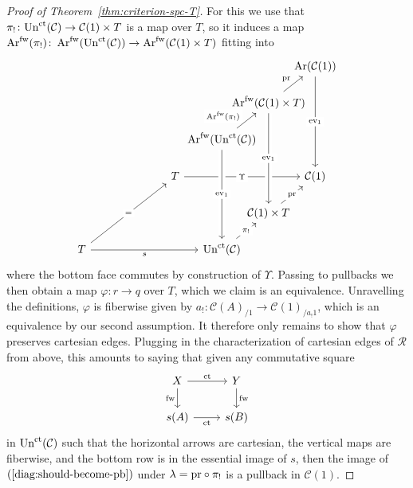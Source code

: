 \documentclass[reqno]{memo-l}
\theoremstyle{mythm}
\theoremstyle{definition}
\numberwithin{equation}{section}
\newcommand{\Cc}{{\mathcal{C}}}
\DeclareMathOperator{\ev}{ev}
\renewcommand{\phi}{\varphi}
\DeclareMathOperator{\Ar}{Ar}
\newcommand{\pr}{\textup{pr}}
\newcommand{\ct}{\textup{ct}}
\newcommand{\Un}{\textup{Un}}
\begin{document}
\begin{proof}[Proof of Theorem~\ref{thm:criterion-spc-T}]
    For this we use that $\pi_!\colon\Un^\ct(\Cc)\to\Cc(1)\times T$ is a map over $T$, so it induces a map $\Ar^\text{fw}(\pi_!)\colon\Ar^\text{fw}(\Un^\ct(\Cc))\to\Ar^\text{fw}(\Cc(1)\times T)$ fitting into
    \[
        \begin{tikzcd}[row sep={3.3em,between origins}, column sep={4.2em,between origins}]
            &&&&& \Ar(\Cc(1))\arrow[ddd,"\ev_1"{description}]\\
            &&&& \Ar^\text{fw}(\Cc(1)\times T)\arrow[ur,"\pr"]\\
            && & \Ar^\text{fw}(\Un^\ct(\Cc))\arrow[ur,"\Ar^\text{fw}(\pi_!)"{description,xshift=-.29in,yshift=.4em}] &&\\
            && T\arrow[rrr,"\Upsilon"{description}] &&&  \Cc(1) \\
            & &&& \Cc(1)\times T\arrow[ur,"\pr"{description}]\arrow[from=uuu,crossing over,"\ev_1"{description}]\\
            T\arrow[uurr,"="{description}]\arrow[rrr,"s"'] &&& \Un^\ct(\Cc)\arrow[ur,"\pi_!"{description}] \arrow[from=uuu,crossing over,"\ev_1"{description}]
        \end{tikzcd}
    \]
    where the bottom face commutes by construction of $\Upsilon$. Passing to pullbacks we then obtain a map $\phi\colon r\to q$ over $T$, which we claim is an equivalence. Unravelling the definitions, $\phi$ is fiberwise given by $a_!\colon\Cc(A)_{/1}\to\Cc(1)_{/a_!1}$, which is an equivalence by our second assumption. It therefore only remains to show that $\phi$ preserves cartesian edges. Plugging in the characterization of cartesian edges of $\mathcal R$ from above, this amounts to saying that given any commutative square
    \begin{equation}\label{diag:should-become-pb}
        \begin{tikzcd}
            X\arrow[r,"\ct"]\arrow[d,"\text{fw}"'] & Y\arrow[d,"\text{fw}"]\\
            s(A)\arrow[r,"\ct"'] & s(B)
        \end{tikzcd}
    \end{equation}
    in $\Un^\ct(\Cc)$ such that the horizontal arrows are cartesian, the vertical maps are fiberwise, and the bottom row is in the essential image of $s$, then the image of $(\ref{diag:should-become-pb})$ under $\lambda=\pr\circ\pi_!$ is a pullback in $\Cc(1)$.
    

\end{proof}
\end{document}
